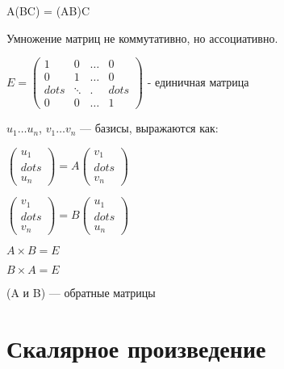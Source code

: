 \begin{theorem}
    
    A(BC) = (AB)C 

    Умножение матриц не коммутативно, но ассоциативно.

\end{theorem}


$E = \left(
        \begin{array}{cccc}
            1 & 0 & \ldots & 0\\
            0 & 1 & \ldots & 0\\
            dots & \ddots & . &dots\\
            0 & 0 & \ldots & 1
        \end{array}
        \right)$ - единичная матрица



        
\begin{remark}
    $u_1 \ldots u_n$, $v_1 \ldots v_n$ --- базисы, выражаются как:
    
    
    $\left(
        \begin{array}{c}
            u_1\\
            dots\\
            u_n
        \end{array}
        \right) = A \left(
            \begin{array}{c}
                v_1\\
                dots\\
                v_n
            \end{array}
            \right)$


$\left(
    \begin{array}{c}
        v_1\\
        dots\\
        v_n
    \end{array}
    \right) = B \left(
        \begin{array}{c}
            u_1\\
            dots\\
            u_n
        \end{array}
        \right)$

$A \times B = E$

$B \times A = E$

(A и B) --- обратные матрицы
\end{remark}



\section{Скалярное произведение}

